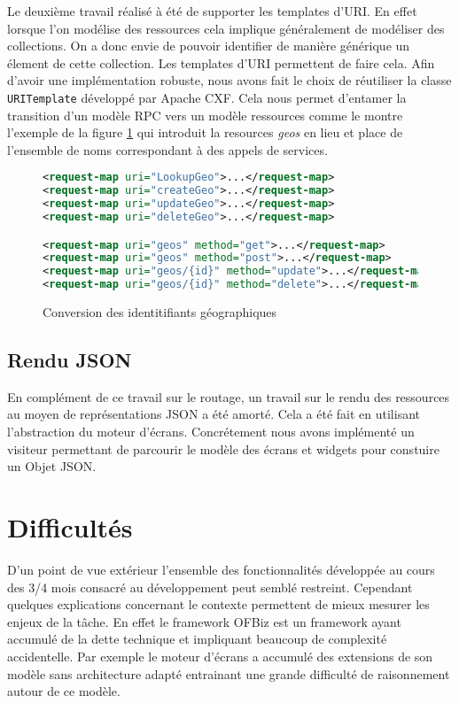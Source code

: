 \documentclass[a4paper, 11pt]{report}
\begin{document}
Le deuxième travail réalisé à été de supporter les templates d'URI.
En effet lorsque l'on modélise des ressources cela implique
généralement de modéliser des collections. On a donc envie de pouvoir
identifier de manière générique un élement de cette collection. Les
templates d'URI permettent de faire cela. Afin d'avoir une
implémentation robuste, nous avons fait le choix de réutiliser la
classe \verb=URITemplate= développé par Apache CXF. Cela nous permet
d'entamer la transition d'un modèle RPC vers un modèle ressources
comme le montre l'exemple de la figure \ref{fig:urit} qui introduit la
resources \emph{geos} en lieu et place de l'ensemble de noms
correspondant à des appels de services.

\begin{figure}
  \begin{lstlisting}[language=xml]
<request-map uri="LookupGeo">...</request-map>
<request-map uri="createGeo">...</request-map>
<request-map uri="updateGeo">...</request-map>
<request-map uri="deleteGeo">...</request-map>

<request-map uri="geos" method="get">...</request-map>
<request-map uri="geos" method="post">...</request-map>
<request-map uri="geos/{id}" method="update">...</request-map>
<request-map uri="geos/{id}" method="delete">...</request-map>
  \end{lstlisting}
\caption{Conversion des identitifiants géographiques}
\label{fig:urit}
\end{figure}

\subsection{Rendu JSON}

En complément de ce travail sur le routage, un travail sur le rendu
des ressources au moyen de représentations JSON a été amorté. Cela a
été fait en utilisant l'abstraction du moteur d'écrans. Concrétement
nous avons implémenté un visiteur \cite{gamma1993design} permettant de
parcourir le modèle des écrans et widgets pour constuire un Objet
JSON.

\section{Difficultés}

D'un point de vue extérieur l'ensemble des fonctionnalités développée
au cours des 3/4 mois consacré au développement peut semblé restreint.
Cependant quelques explications concernant le contexte permettent de
mieux mesurer les enjeux de la tâche. En effet le framework OFBiz est
un framework ayant accumulé de la dette technique et impliquant
beaucoup de complexité accidentelle. Par exemple le moteur d'écrans a
accumulé des extensions de son modèle sans architecture adapté
entrainant une grande difficulté de raisonnement autour de ce modèle.
\end{document}
